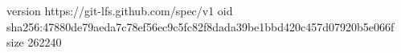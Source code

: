 version https://git-lfs.github.com/spec/v1
oid sha256:47880de79aeda7c78ef56ec9c5fc82f8dada39be1bbd420c457d07920b5e066f
size 262240
